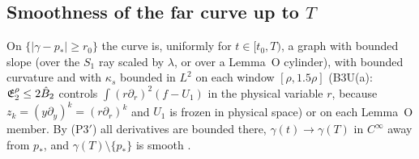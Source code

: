 \documentclass[11pt]{article}
\begin{document}
\subsection{Smoothness of the far curve up to $T$}
On $\{|\gamma-p_*|\ge r_0\}$ the curve is, uniformly for $t\in[t_0,T)$, a graph with bounded slope (over the $S_1$ ray scaled by $\lambda$, or over a Lemma~O cylinder), with bounded curvature and with $\kappa_s$ bounded in $L^2$ on each window $[\rho,1.5\rho]$ (B3U(a): $\mathfrak E^\rho_2\le2\hat B_2$ controls $\int(r\partial_r)^2(f-U_1)$ in the physical variable $r$, because $z_k=(y\partial_y)^k=(r\partial_r)^k$ and $U_1$ is frozen in physical space) or on each Lemma~O member. By (P3$'$) all derivatives are bounded there, $\gamma(t)\to\gamma(T)$ in $C^\infty$ away from $p_*$, and $\gamma(T)\setminus\{p_*\}$ is smooth \tP.
\end{document}
